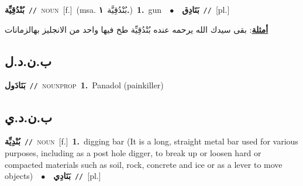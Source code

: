 \documentclass[10pt,a4paper,twoside]{article} %
\begin{document}
\begin{multicols}{2}
{\setlength\topsep{0pt}\textbf{\foreignlanguage{arabic}{بُنْدُقِيِّة}}\ {\color{gray}\texttt{//}\color{black}}\ \textsc{noun}\ [f.]\ \color{gray}(msa. \foreignlanguage{arabic}{بُنْدُقِيَّة}~\foreignlanguage{arabic}{\textbf{١.}})\color{black}\ \textbf{1.}~gun\ \ $\bullet$\ \ \setlength\topsep{0pt}\textbf{\foreignlanguage{arabic}{بَنَادِق}}\ {\color{gray}\texttt{//}\color{black}}\ [pl.]\  \begin{flushright}\color{gray}\foreignlanguage{arabic}{\textbf{\underline{\foreignlanguage{arabic}{أمثلة}}}: بقى سيدك الله يرحمه عنده بُنْدُقِيِّة طخ فيها واحد من الانجليز بهالزمانات}\end{flushright}\color{black}} \vspace{2mm}

\vspace{-3mm}
\subsection*{\color{blue}\foreignlanguage{arabic}{ب.ن.د.ل}\color{blue}{ (ntws)}} 

{\setlength\topsep{0pt}\textbf{\foreignlanguage{arabic}{بَنَادَول}}\ {\color{gray}\texttt{//}\color{black}}\ \textsc{noun\textunderscore prop}\ \textbf{1.}~Panadol (painkiller)\ } \vspace{2mm}

\vspace{-3mm}
\subsection*{\color{blue}\foreignlanguage{arabic}{ب.ن.د.ي}\color{blue}{ (ntws)}} 

{\setlength\topsep{0pt}\textbf{\foreignlanguage{arabic}{بُنْدِيِّة}}\ {\color{gray}\texttt{//}\color{black}}\ \textsc{noun}\ [f.]\ \textbf{1.}~digging bar (It is a long, straight metal bar used for various purposes, including as a post hole digger, to break up or loosen hard or compacted materials such as soil, rock, concrete and ice or as a lever to move objects)\ \ $\bullet$\ \ \setlength\topsep{0pt}\textbf{\foreignlanguage{arabic}{بَنَادِي}}\ {\color{gray}\texttt{//}\color{black}}\ [pl.]\ } \vspace{2mm}


\end{multicols}
\end{document}
